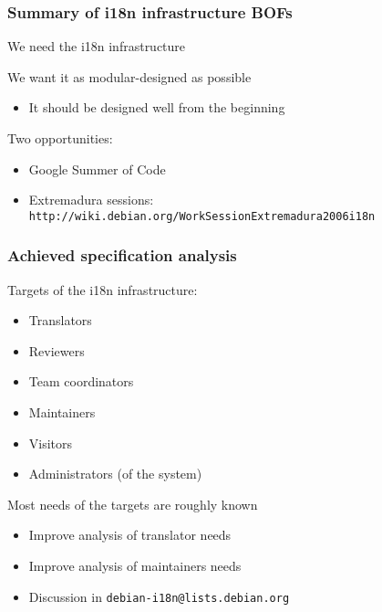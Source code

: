 \documentclass{beamer}
\begin{document}
\begin{frame}
  \frametitle{Summary of i18n infrastructure BOFs}
	\begin{block}
		{We need the i18n infrastructure}
	\end{block}
	\begin{block}
		{We want it as modular-designed as possible}
	\begin{itemize}
	\item
		{It should be designed well from the beginning}
	\end{itemize}
	\end{block}
	\begin{block}
		{Two opportunities:}
	\begin{itemize}
	\item
		{Google Summer of Code}
	\item
		{Extremadura sessions: \tiny{\texttt{http://wiki.debian.org/WorkSessionExtremadura2006i18n}}}
	\end{itemize}
	\end{block}
\end{frame}


\begin{frame}
  \frametitle{Achieved specification analysis}
	\begin{block}
		{Targets of the i18n infrastructure:}
	\begin{itemize}
	\item
		{Translators}
	\item
		{Reviewers}
	\item
		{Team coordinators}
	\item
		{Maintainers}
	\item
		{Visitors}
	\item
		{Administrators (of the system)}
	\end{itemize}
	\end{block}
	\begin{block}
		{Most needs of the targets are roughly known}
	\begin{itemize}
	\item
		{Improve analysis of translator needs}
	\item
		{Improve analysis of maintainers needs}
	\item
		{Discussion in \texttt{debian-i18n@lists.debian.org}}
	\end{itemize}
	\end{block}
\end{frame}
\end{document}
